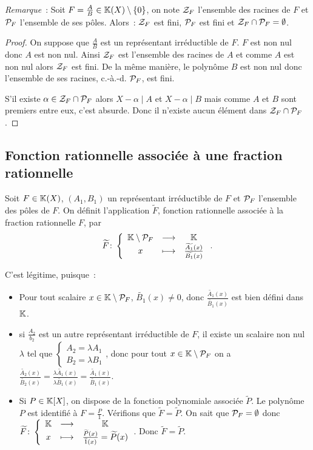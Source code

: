\emph{Remarque}~: Soit \(F=\frac{A}{B} \in \K(X)\setminus\{0\}\), on note \(\ZZ_F\) l'ensemble des racines de \(F\) et \(\P_F\) l'ensemble de ses pôles. Alors~: \(\ZZ_F\) est fini, \(\P_F\) est fini et \(\ZZ_F \cap \P_F =\emptyset\).

\begin{proof}
  On suppose que \(\frac{A}{B}\) est un représentant irréductible de \(F\). \(F\) est non nul donc \(A\) est non nul. Ainsi \(\ZZ_F\) est l'ensemble des racines de \(A\) et comme \(A\) est non nul alors \(\ZZ_F\) est fini. De la même manière, le polynôme \(B\) est non nul donc l'ensemble de ses racines, c.-à.-d. \(\P_F\), est fini.
  
  S'il existe \(\alpha \in \ZZ_F \cap \P_F\) alors \(X-\alpha\mid{}A\) et \(X-\alpha\mid{}B\) mais comme \(A\) et \(B\) sont premiers entre eux, c'est absurde. Donc il n'existe aucun élément dans \(\ZZ_F \cap \P_F\).
\end{proof}

\subsection{Fonction rationnelle associée à une fraction rationnelle}

\begin{defdef}
  Soit \(F \in \K(X)\), \((A_1,B_1)\) un représentant irréductible de \(F\) et \(\P_F\) l'ensemble des pôles de \(F\). On définit l'application \(\widetilde{F}\), fonction rationnelle associée à la fraction rationnelle \(F\), par
  \begin{equation}
    \fonction{\widetilde{F}}{\K\setminus\P_F}{\K}{x}{\frac{\widetilde{A_1}(x)}{\widetilde{B_1}(x)}}.
  \end{equation}
\end{defdef}

C'est légitime, puisque~:
\begin{itemize}
\item Pour tout scalaire \(x \in \K\setminus\P_F\), \(\widetilde{B_1}(x) \neq 0\), donc \(\frac{\widetilde{A_1}(x)}{\widetilde{B_1}(x)}\) est bien défini dans \(\K\).
\item si \(\frac{A_2}{b_2}\) est un autre représentant irréductible de \(F\), il existe un scalaire non nul \(\lambda\) tel que \(\begin{cases}A_2 = \lambda A_1 \\ B_2=\lambda B_1\end{cases}\), donc pour tout \(x \in \K\setminus\P_F\) on a \(\frac{\widetilde{A_2}(x)}{\widetilde{B_2}(x)}=\frac{\lambda \widetilde{A_1}(x)}{\lambda \widetilde{B_1}(x)}=\frac{\widetilde{A_1}(x)}{\widetilde{B_1}(x)}\).
\item Si \(P \in \K[X]\), on dispose de la fonction polynomiale associée \(\widetilde{P}\). Le polynôme \(P\) est identifié à \(F=\frac{P}{1}\). Vérifions que \(\widetilde{F}=\widetilde{P}\). On sait que \(\P_F=\emptyset\) donc \(\fonction{\widetilde{F}}{\K}{\K}{x}{\frac{\widetilde{P}(x)}{\widetilde{1}(x)}=\widetilde{P}(x)}\). Donc  \(\widetilde{F}=\widetilde{P}\). 
\end{itemize}

